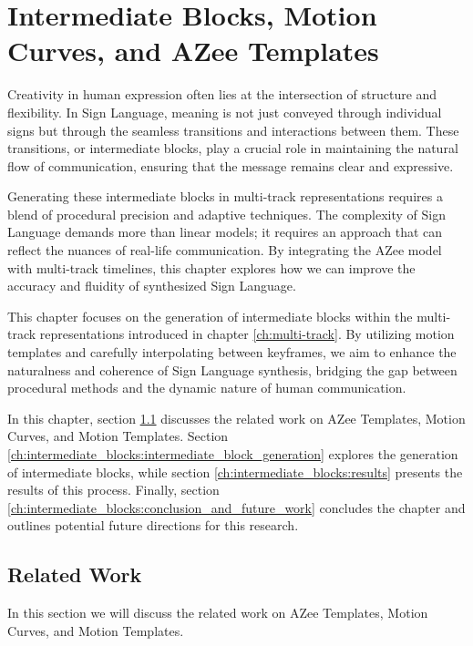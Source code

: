 \documentclass[../../main.tex]{subfiles}
\begin{document}
\chapter{Intermediate Blocks, Motion Curves, and AZee Templates}
\label{ch:intermediate_blocks}

Creativity in human expression often lies at the intersection of structure and flexibility. In Sign Language, meaning is not just conveyed through individual signs but through the seamless transitions and interactions between them. These transitions, or intermediate blocks, play a crucial role in maintaining the natural flow of communication, ensuring that the message remains clear and expressive.

Generating these intermediate blocks in multi-track representations requires a blend of procedural precision and adaptive techniques. The complexity of Sign Language demands more than linear models; it requires an approach that can reflect the nuances of real-life communication. By integrating the AZee model with multi-track timelines, this chapter explores how we can improve the accuracy and fluidity of synthesized Sign Language.

This chapter focuses on the generation of intermediate blocks within the multi-track representations introduced in chapter \ref{ch:multi-track}. By utilizing motion templates and carefully interpolating between keyframes, we aim to enhance the naturalness and coherence of Sign Language synthesis, bridging the gap between procedural methods and the dynamic nature of human communication.

In this chapter, section \ref{ch:intermediate_blocks:related_work} discusses the related work on AZee Templates, Motion Curves, and Motion Templates. Section \ref{ch:intermediate_blocks:intermediate_block_generation} explores the generation of intermediate blocks, while section \ref{ch:intermediate_blocks:results} presents the results of this process. Finally, section \ref{ch:intermediate_blocks:conclusion_and_future_work} concludes the chapter and outlines potential future directions for this research.

\section{Related Work}
\label{ch:intermediate_blocks:related_work}

In this section we will discuss the related work on AZee Templates, Motion Curves, and Motion Templates. 
\end{document}
